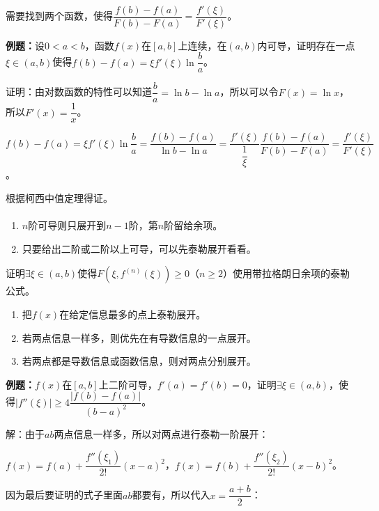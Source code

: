 \paragraph{}

需要找到两个函数，使得$\dfrac{f(b)-f(a)}{F(b)-F(a)}=\dfrac{f'(\xi)}{F'(\xi)}$。

\textbf{例题：}设$0<a<b$，函数$f(x)$在$[a,b]$上连续，在$(a,b)$内可导，证明存在一点$\xi\in(a,b)$使得$f(b)-f(a)=\xi f'(\xi)\ln\dfrac{b}{a}$。

证明：由对数函数的特性可以知道$\dfrac{b}{a}=\ln b-\ln a$，所以可以令$F(x)=\ln x$，所以$F'(x)=\dfrac{1}{x}$。

$f(b)-f(a)=\xi f'(\xi)\ln\dfrac{b}{a}=\dfrac{f(b)-f(a)}{\ln b-\ln a}=\dfrac{f'(\xi)}{\dfrac{1}{\xi}}\dfrac{f(b)-f(a)}{F(b)-F(a)}=\dfrac{f'(\xi)}{F'(\xi)}$。

根据柯西中值定理得证。

\paragraph{}

\begin{enumerate}
    \item $n$阶可导则只展开到$n-1$阶，第$n$阶留给余项。
    \item 只要给出二阶或二阶以上可导，可以先泰勒展开看看。
\end{enumerate}

证明$\exists\xi\in(a,b)$使得$F(\xi,f^{(n)}(\xi))\geqslant0$（$n\geqslant2$）使用带拉格朗日余项的泰勒公式。

\begin{enumerate}
    \item 把$f(x)$在给定信息最多的点上泰勒展开。
    \item 若两点信息一样多，则优先在有导数信息的一点展开。
    \item 若两点都是导数信息或函数信息，则对两点分别展开。
\end{enumerate}

\textbf{例题：}$f(x)$在$[a,b]$上二阶可导，$f'(a)=f'(b)=0$，证明$\exists\xi\in(a,b)$，使得$\vert f''(\xi)\vert\geqslant4\dfrac{\vert f(b)-f(a)\vert}{(b-a)^2}$。

解：由于$ab$两点信息一样多，所以对两点进行泰勒一阶展开：

$f(x)=f(a)+\dfrac{f''(\xi_1)}{2!}(x-a)^2$，$f(x)=f(b)+\dfrac{f''(\xi_2)}{2!}(x-b)^2$。

因为最后要证明的式子里面$ab$都要有，所以代入$x=\dfrac{a+b}{2}$：

